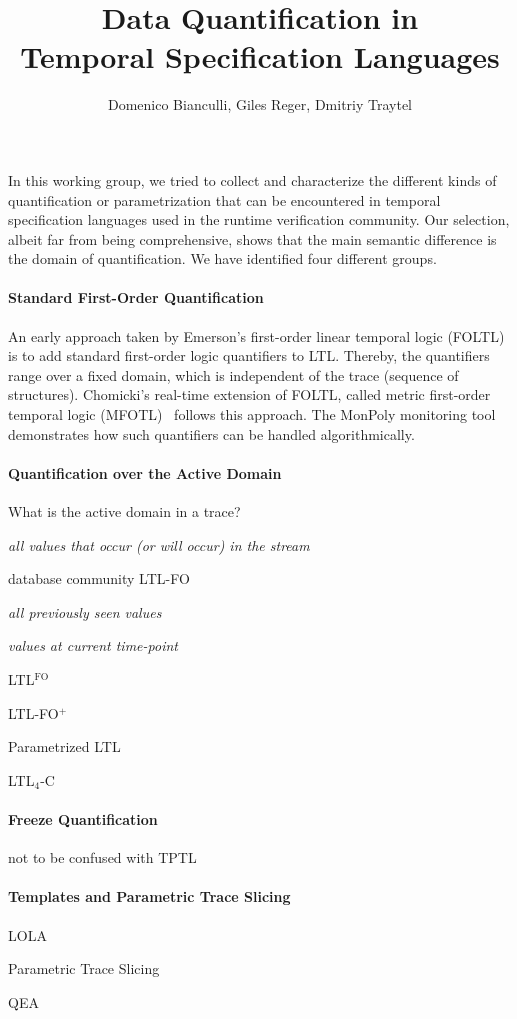 \documentclass{article}
\title{Data Quantification in\\ Temporal Specification Languages}
\author{Domenico Bianculli, Giles Reger, Dmitriy Traytel}
\begin{document}
\maketitle

In this working group, we tried to collect and characterize the different kinds of quantification or parametrization that can be encountered in temporal specification languages used in the runtime verification community.
Our selection, albeit far from being comprehensive, shows that the main semantic difference is the domain of quantification. We have identified four different groups.

\paragraph{Standard First-Order Quantification}

An early approach taken by Emerson's first-order linear temporal logic (FOLTL)~\cite{Emerson90} is to add standard first-order logic quantifiers to LTL. Thereby, the quantifiers range over a fixed domain, which is independent of the trace (sequence of structures). Chomicki's real-time extension of FOLTL, called metric first-order temporal logic (MFOTL)~\cite{Chomicki95} follows this approach. The MonPoly monitoring tool~\cite{BasinKMZ15} demonstrates how such quantifiers can be handled algorithmically. 

\paragraph{Quantification over the Active Domain}

What is the active domain in a trace?

\emph{all values that occur (or will occur) in the stream}

database community LTL-FO~\cite{DeutschSVZ06}

\emph{all previously seen values}

\emph{values at current time-point}

LTL$^\text{FO}$~\cite{BauerKV15}

LTL-FO$^+$~\cite{HalleV08}

Parametrized LTL~\cite{Stolz10}

LTL$_4$-C~\cite{MedhatBFJ16}

\paragraph{Freeze Quantification}

not to be confused with TPTL 

\cite{BasinKZ17}

\paragraph{Templates and Parametric Trace Slicing}

LOLA~\cite{FaymonvilleFST16}

Parametric Trace Slicing~\cite{ChenR09,RegerR15}

QEA~\cite{BarringerFHRR12}



\end{document}

